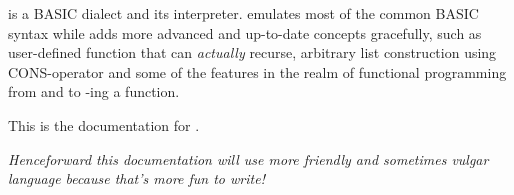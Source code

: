 \tbas{} is a BASIC dialect and its interpreter. \tbas{} emulates most of the common BASIC syntax while adds more advanced and up-to-date concepts gracefully, such as user-defined function that can \emph{actually} recurse, arbitrary list construction using CONS-operator and some of the features in the realm of functional programming from  and  to -ing a function.

This is the documentation for \tbas{} \tbasver{}.

\vfill

\small\emph{Henceforward this documentation will use more friendly and sometimes vulgar language because that's more fun to write!}
